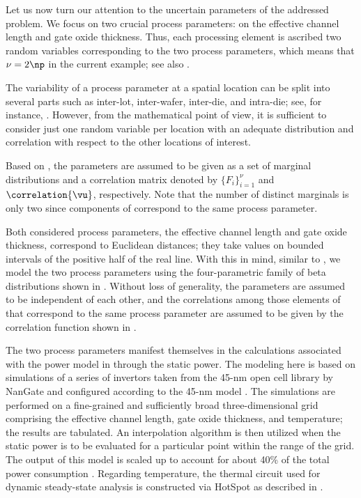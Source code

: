 Let us now turn our attention to the uncertain parameters \vu of the addressed
problem. We focus on two crucial process parameters: on the effective channel
length and gate oxide thickness. Thus, each processing element is ascribed two
random variables corresponding to the two process parameters, which means that
$\nu = 2 \np$ in the current example; see also .

\begin{remark}
The variability of a process parameter at a spatial location can be split into
several parts such as inter-lot, inter-wafer, inter-die, and intra-die; see, for
instance, \cite{juan2012}. However, from the mathematical point of view, it is
sufficient to consider just one random variable per location with an adequate
distribution and correlation with respect to the other locations of interest.
\end{remark}

Based on , the parameters \vu are assumed to be given as
a set of marginal distributions and a correlation matrix denoted by $\{ F_i
\}_{i = 1}^\nu$ and $\correlation{\vu}$, respectively. Note that the number of
distinct marginals is only two since \np components of \vu correspond to the
same process parameter.

Both considered process parameters, the effective channel length and gate oxide
thickness, correspond to Euclidean distances; they take values on bounded
intervals of the positive half of the real line. With this in mind, similar to
, we model the two process parameters using
the four-parametric family of beta distributions shown in
. Without loss of generality, the parameters are assumed
to be independent of each other, and the correlations among those elements of
\vu that correspond to the same process parameter are assumed to be given by the
correlation function shown in .

The two process parameters manifest themselves in the calculations associated
with the power model in  through the static power.
The modeling here is based on  simulations of a series of 
invertors taken from the 45-nm open cell library by NanGate \cite{nangate} and
configured according to the 45-nm   model \cite{ptm}. The
simulations are performed on a fine-grained and sufficiently broad
three-dimensional grid comprising the effective channel length, gate oxide
thickness, and temperature; the results are tabulated. An interpolation
algorithm is then utilized when the static power is to be evaluated for a
particular point within the range of the grid. The output of this model is
scaled up to account for about 40\% of the total power consumption
\cite{liu2007}. Regarding temperature, the thermal  circuit used for
dynamic steady-state analysis is constructed via HotSpot \cite{skadron2003} as
described in .

